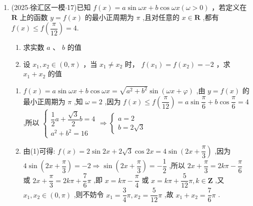 \begin{enumerate}
\begin{jieda}
\begin{enumerate}
        \end{enumerate}
    \end{jieda}
    \item (2025$\cdot$徐汇区一模$\cdot$17)已知 $f\left( x\right)  = a\sin {\omega x} + b\cos {\omega x}\left( {\omega  > 0}\right)$ ，若定义在 $\mathbf{R}$ 上的函数 $y = f\left( x\right)$ 的最小正周期为 $\pi$ ,且对任意的 $x \in  \mathbf{R}$ ,都有 $f\left( x\right)  \leq  f\left( \dfrac{\pi }{12}\right)  = 4$.
    \begin{enumerate}
        \item 求实数 $a$ 、 $b$ 的值
        \item 设 ${x}_{1},{x}_{2} \in  \left( {0,\pi }\right)$ ，当 ${x}_{1} \neq  {x}_{2}$ 时， $f\left( {x}_{1}\right)  = f\left( {x}_{2}\right)  =  - 2$ ，求 ${x}_{1} + {x}_{2}$ 的值
    \end{enumerate}
    \begin{jieda}
        \begin{enumerate}
            \item $f\left( x\right)  = a\sin {\omega x} + b\cos {\omega x} = \sqrt{{a}^{2} + {b}^{2}}\sin \left( {{\omega x} + \varphi }\right)$ ,由 $y = f\left( x\right)$ 的最小正周期为 $\pi$ ,知 $\omega  = 2$ ,因为 $f\left( x\right)  \leq  f\left( \dfrac{\pi }{12}\right)  =  a\sin \dfrac{\pi }{6} + b\cos \dfrac{\pi }{6} = 4$ ,所以 $\left\{  {\begin{array}{l} \dfrac{1}{2}a + \dfrac{\sqrt{3}}{2}b = 4 \\  {a}^{2} + {b}^{2} = {16} \end{array} \Longrightarrow  \left\{  \begin{array}{l} a = 2 \\  b = 2\sqrt{3} \end{array}\right. }\right.$
            \item 由(1)可得: $f\left( x\right)  = 2\sin {2x} + 2\sqrt{3}\cos {2x} = 4\sin \left( {{2x} + }\right.  \left. \dfrac{\pi }{3}\right)$ ,因为 $4\sin \left( {{2x} + \dfrac{\pi }{3}}\right)  =  - 2 \Longrightarrow  \sin \left( {{2x} + \dfrac{\pi }{3}}\right)  =  - \dfrac{1}{2}$ ,所以 ${2x} + \dfrac{\pi }{3} = {2k\pi } - \dfrac{\pi }{6}$ 或 ${2x} + \dfrac{\pi }{3} = {2k\pi } + \dfrac{7}{6}\pi$ ,即 $x = {k\pi } -  \dfrac{\pi }{4}$ 或 $x = {k\pi } + \dfrac{5}{12}\pi ,k \in  \mathbf{Z}$ ,又 ${x}_{1},{x}_{2} \in  \left( {0,\pi }\right)$ ,则不妨令 ${x}_{1} =  \dfrac{3}{4}\pi ,{x}_{2} = \dfrac{5}{12}\pi$ ,故 ${x}_{1} + {x}_{2} = \dfrac{7}{6}\pi$ .
        \end{enumerate}
    \end{jieda}


\end{enumerate}
